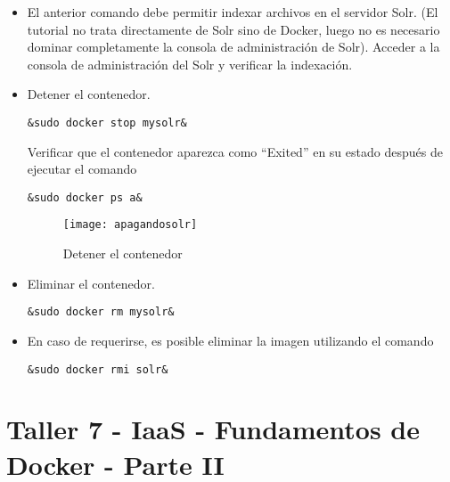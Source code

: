 \documentclass[10pt]{article}   			%
\begin{document}
\begin{itemize}
\item El anterior comando debe permitir indexar archivos en el servidor Solr. (El tutorial no trata directamente de Solr sino de Docker, luego no es necesario dominar completamente la consola de administración de Solr). Acceder a la consola de administración del Solr y verificar la indexación.

\item Detener el contenedor.
\begin{small}
\begin{lstlisting}[frame=single,style=base]	
	&sudo docker stop mysolr&
\end{lstlisting}
\end{small}

Verificar que el contenedor aparezca como “Exited” en su estado después de ejecutar el comando

\begin{small}
\begin{lstlisting}[frame=single,style=base]	
	&sudo docker ps a&
\end{lstlisting}
\end{small}
\begin{figure}[ht] 
	\centering
		\texttt{[image: apagandosolr]}   
	\caption{Detener el contenedor} \label{fig:apagandosolr}
\end{figure}

\item Eliminar el contenedor.
\begin{small}
\begin{lstlisting}[frame=single,style=base]	
	&sudo docker rm mysolr&
\end{lstlisting}
\end{small}

\item En caso de requerirse, es posible eliminar la imagen utilizando el comando
\begin{small}
\begin{lstlisting}[frame=single,style=base]	
	&sudo docker rmi solr&
\end{lstlisting}
\end{small}

\end{itemize}

\newpage 

\section{Taller 7 - IaaS - Fundamentos de Docker - Parte II}
\end{document}
